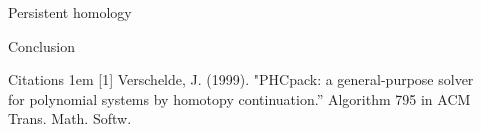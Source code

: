 \documentclass{beamer}
\begin{document}
\begin{frame}{}
\begin{columns}[t]
\begin{column}{0.32\linewidth}
\end{column}%

\begin{column}{0.32\linewidth}

\begin{block}{Persistent homology}

\end{block}

\begin{block}{Conclusion}


\end{block}
\begin{block}{Citations}
\hangindent1em
[1] Verschelde, J. (1999). "PHCpack: a general-purpose solver for polynomial systems by homotopy continuation.'' Algorithm 795 in  ACM Trans. Math. Softw. 
\\


\end{block}

\end{column}%

\end{columns}
\end{frame}
\end{document}
